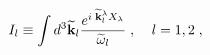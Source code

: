 \begin{equation}
I_l  
\equiv 
\int d^3 \widetilde{\bf k}_l
\frac{e^{i\; \widetilde{\bf k}_l^\lambda X_\lambda}}
{\widetilde\omega_l} 
\;, \;\;\;\; l=1,2\;,
\label{I_a}
\end{equation}


